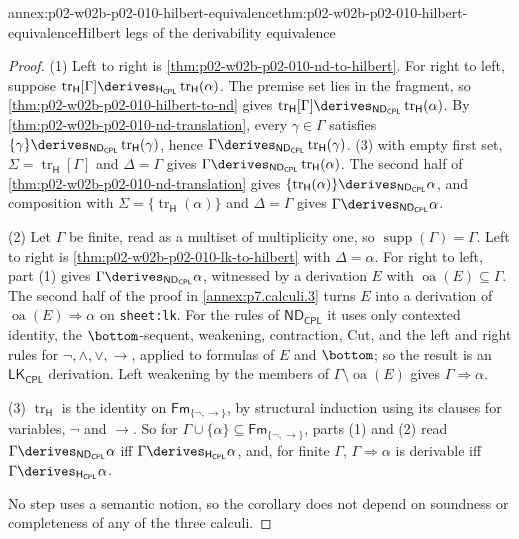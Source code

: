 \begin{annexitem}{annex:p02-w02b-p02-010-hilbert-equivalence}{thm:p02-w02b-p02-010-hilbert-equivalence}{Hilbert legs of the derivability equivalence}
\begin{proof}
(1) Left to right is \cref{thm:p02-w02b-p02-010-nd-to-hilbert}.  For right
to left, suppose
\(\operatorname{tr}_{\mathsf H}[\Gamma]\derives_{\mathsf H_{\mathsf{CPL}}}
\operatorname{tr}_{\mathsf H}(\alpha)\).  The premise set lies in the
fragment, so \cref{thm:p02-w02b-p02-010-hilbert-to-nd} gives
\(\operatorname{tr}_{\mathsf H}[\Gamma]\derives_{\mathsf{ND}_{\mathsf{CPL}}}
\operatorname{tr}_{\mathsf H}(\alpha)\).  By
\cref{thm:p02-w02b-p02-010-nd-translation}, every \(\gamma\in\Gamma\)
satisfies \(\{\gamma\}\derives_{\mathsf{ND}_{\mathsf{CPL}}}
\operatorname{tr}_{\mathsf H}(\gamma)\), hence
\(\Gamma\derives_{\mathsf{ND}_{\mathsf{CPL}}}\operatorname{tr}_{\mathsf H}(\gamma)\).
(3) with empty first set,
\(\Sigma=\operatorname{tr}_{\mathsf H}[\Gamma]\) and \(\Delta=\Gamma\) gives
\(\Gamma\derives_{\mathsf{ND}_{\mathsf{CPL}}}\operatorname{tr}_{\mathsf H}(\alpha)\).
The second half of \cref{thm:p02-w02b-p02-010-nd-translation} gives
\(\{\operatorname{tr}_{\mathsf H}(\alpha)\}\derives_{\mathsf{ND}_{\mathsf{CPL}}}\alpha\),
and composition with \(\Sigma=\{\operatorname{tr}_{\mathsf H}(\alpha)\}\)
and \(\Delta=\Gamma\) gives \(\Gamma\derives_{\mathsf{ND}_{\mathsf{CPL}}}\alpha\).

(2) Let \(\Gamma\) be finite, read as a multiset of multiplicity one, so
\(\operatorname{supp}(\Gamma)=\Gamma\).  Left to right is
\cref{thm:p02-w02b-p02-010-lk-to-hilbert} with \(\Delta=\alpha\).  For
right to left, part (1) gives \(\Gamma\derives_{\mathsf{ND}_{\mathsf{CPL}}}\alpha\),
witnessed by a derivation \(E\) with \(\operatorname{oa}(E)\subseteq\Gamma\).
The second half of the proof in \cref{annex:p7.calculi.3} turns \(E\) into a
derivation of \(\operatorname{oa}(E)\Rightarrow\alpha\) on
\texttt{sheet:\allowbreak lk}.  For the rules of
\(\mathsf{ND}_{\mathsf{CPL}}\) it uses only contexted identity, the
\(\bottom\)-sequent, weakening, contraction, Cut, and the left and right
rules for \(\neg,\land,\lor,\to\), applied to formulas of \(E\) and
\(\bottom\); so the result is an \(\mathsf{LK}_{\mathsf{CPL}}\) derivation.
Left weakening by the members of \(\Gamma\setminus\operatorname{oa}(E)\)
gives \(\Gamma\Rightarrow\alpha\).

(3) \(\operatorname{tr}_{\mathsf H}\) is the identity on
\(\mathsf{Fm}_{\{\neg,\to\}}\), by structural induction using its clauses for
variables, \(\neg\) and \(\to\).  So for
\(\Gamma\cup\{\alpha\}\subseteq\mathsf{Fm}_{\{\neg,\to\}}\), parts (1) and (2)
read \(\Gamma\derives_{\mathsf{ND}_{\mathsf{CPL}}}\alpha\) iff
\(\Gamma\derives_{\mathsf H_{\mathsf{CPL}}}\alpha\), and, for finite
\(\Gamma\), \(\Gamma\Rightarrow\alpha\) is derivable iff
\(\Gamma\derives_{\mathsf H_{\mathsf{CPL}}}\alpha\).

No step uses a semantic notion, so the corollary does not depend on
soundness or completeness of any of the three calculi.
\end{proof}
\end{annexitem}
